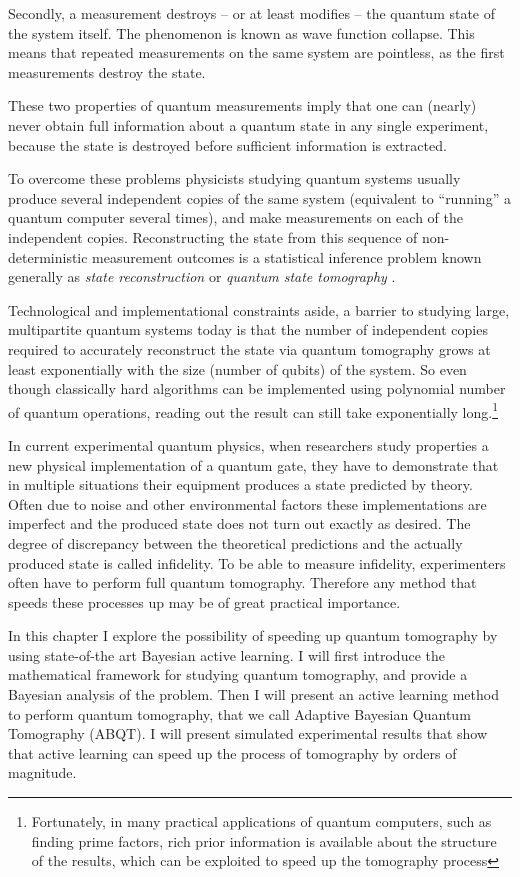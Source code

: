 Secondly, a measurement destroys -- or at least modifies -- the quantum state of the system itself. The phenomenon is known as wave function collapse. This means that repeated measurements on the same system are pointless, as the first measurements destroy the state.

These two properties of quantum measurements imply that one can (nearly) never obtain full information about a quantum state in any single experiment, because the state is destroyed before sufficient information is extracted.

To overcome these problems physicists studying quantum systems usually produce several independent copies of the same system (equivalent to ``running'' a quantum computer several times), and make measurements on each of the independent copies. Reconstructing the state from this sequence of non-deterministic measurement outcomes is a statistical inference problem known generally as \emph{state reconstruction} or \emph{quantum state tomography} \citep{Artiles2005}.

Technological and implementational constraints aside, a barrier to studying large, multipartite quantum systems today is that the number of independent copies required to accurately reconstruct the state via quantum tomography grows at least exponentially with the size (number of qubits) of the system. So even though classically hard algorithms can be implemented using polynomial number of quantum operations, reading out the result can still take exponentially long.\footnote{Fortunately, in many practical applications of quantum computers, such as finding prime factors, rich prior information is available about the structure of the results, which can be exploited to speed up the tomography process}

In current experimental quantum physics, when researchers study properties a new physical implementation of a quantum gate, they have to demonstrate that in multiple situations their equipment produces a state predicted by theory. Often due to noise and other environmental factors these implementations are imperfect and the produced state does not turn out exactly as desired. The degree of discrepancy between the theoretical predictions and the actually produced state is called infidelity. To be able to measure infidelity, experimenters often have to perform full quantum tomography. Therefore any method that speeds these processes up may be of great practical importance.

In this chapter I explore the possibility of speeding up quantum tomography by using state-of-the art Bayesian active learning. I will first introduce the mathematical framework for studying quantum tomography, and provide a Bayesian analysis of the problem. Then I will present an active learning method to perform quantum tomography, that we call Adaptive Bayesian Quantum Tomography (ABQT). I will present simulated experimental results that show that active learning can speed up the process of tomography by orders of magnitude.

